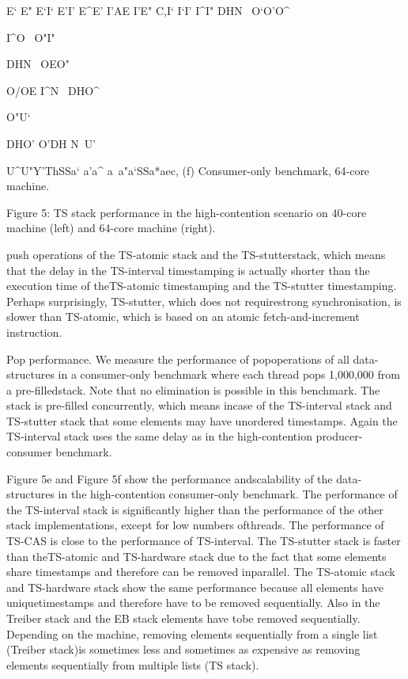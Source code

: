 E` E" E`I` E'I' E^E' I'AE I'E" C,I` I`I'
I^I"
DHN~
O`O'O^

I^O~
O"I"

DHN~
OEO"

O/OE
I^N~
DHO^

O"U`

DHO'
O'DH
N~U'

U^U"Y'ThSSa` a'a^ a~a"a`SSa*aec,
(f) Consumer-only benchmark, 64-core machine.

Figure 5: TS stack performance in the high-contention scenario on 40-core machine (left) and 64-core machine (right).

push operations of the TS-atomic stack and the TS-stutterstack, which means that the delay in the TS-interval timestamping is actually shorter than the execution time of theTS-atomic timestamping and the TS-stutter timestamping.
Perhaps surprisingly, TS-stutter, which does not requirestrong synchronisation, is slower than TS-atomic, which is
based on an atomic fetch-and-increment instruction.

Pop performance. We measure the performance of popoperations of all data-structures in a consumer-only benchmark where each thread pops 1,000,000 from a pre-filledstack. Note that no elimination is possible in this benchmark. The stack is pre-filled concurrently, which means incase of the TS-interval stack and TS-stutter stack that some
elements may have unordered timestamps. Again the TS-interval stack uses the same delay as in the high-contention
producer-consumer benchmark.

Figure 5e and Figure 5f show the performance andscalability of the data-structures in the high-contention
consumer-only benchmark. The performance of the TS-interval stack is significantly higher than the performance of
the other stack implementations, except for low numbers ofthreads. The performance of TS-CAS is close to the performance of TS-interval. The TS-stutter stack is faster than theTS-atomic and TS-hardware stack due to the fact that some
elements share timestamps and therefore can be removed inparallel. The TS-atomic stack and TS-hardware stack show
the same performance because all elements have uniquetimestamps and therefore have to be removed sequentially.
Also in the Treiber stack and the EB stack elements have tobe removed sequentially. Depending on the machine, removing elements sequentially from a single list (Treiber stack)is sometimes less and sometimes as expensive as removing
elements sequentially from multiple lists (TS stack).

